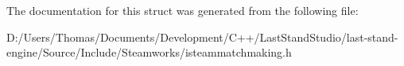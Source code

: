 The documentation for this struct was generated from the following file\+:\begin{DoxyCompactItemize}
\item 
D\+:/\+Users/\+Thomas/\+Documents/\+Development/\+C++/\+Last\+Stand\+Studio/last-\/stand-\/engine/\+Source/\+Include/\+Steamworks/isteammatchmaking.\+h\end{DoxyCompactItemize}
